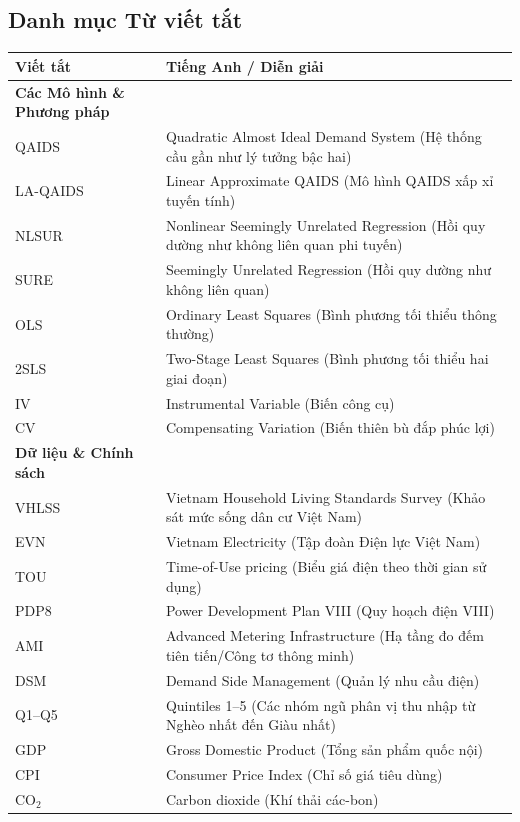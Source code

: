 \documentclass[12pt,a4paper,oneside]{article}
\begin{document}
\subsection{Danh mục Từ viết tắt}
\begin{longtable}{p{} p{}}
	\toprule
	\textbf{Viết tắt} & \textbf{Tiếng Anh / Diễn giải} \\
	\midrule
	\textbf{Các Mô hình \& Phương pháp} & \\
	QAIDS & Quadratic Almost Ideal Demand System (Hệ thống cầu gần như lý tưởng bậc hai) \\
	LA-QAIDS & Linear Approximate QAIDS (Mô hình QAIDS xấp xỉ tuyến tính) \\
	NLSUR & Nonlinear Seemingly Unrelated Regression (Hồi quy dường như không liên quan phi tuyến) \\
	SURE & Seemingly Unrelated Regression (Hồi quy dường như không liên quan) \\
	OLS & Ordinary Least Squares (Bình phương tối thiểu thông thường) \\
	2SLS & Two-Stage Least Squares (Bình phương tối thiểu hai giai đoạn) \\
	IV & Instrumental Variable (Biến công cụ) \\
	CV & Compensating Variation (Biến thiên bù đắp phúc lợi) \\
	\midrule
	\textbf{Dữ liệu \& Chính sách} & \\
	VHLSS & Vietnam Household Living Standards Survey (Khảo sát mức sống dân cư Việt Nam) \\
	EVN & Vietnam Electricity (Tập đoàn Điện lực Việt Nam) \\
	TOU & Time-of-Use pricing (Biểu giá điện theo thời gian sử dụng) \\
	PDP8 & Power Development Plan VIII (Quy hoạch điện VIII) \\
	AMI & Advanced Metering Infrastructure (Hạ tầng đo đếm tiên tiến/Công tơ thông minh) \\
	DSM & Demand Side Management (Quản lý nhu cầu điện) \\
	Q1--Q5 & Quintiles 1--5 (Các nhóm ngũ phân vị thu nhập từ Nghèo nhất đến Giàu nhất) \\
	GDP & Gross Domestic Product (Tổng sản phẩm quốc nội) \\
	CPI & Consumer Price Index (Chỉ số giá tiêu dùng) \\
	CO$_2$ & Carbon dioxide (Khí thải các-bon) \\
	\bottomrule
\end{longtable}

\newpage
{}
\renewcommand{\bibname}{Tài liệu tham khảo}	
\nocite{*}
\printbibliography
\vspace*{3cm} %
\end{document}
